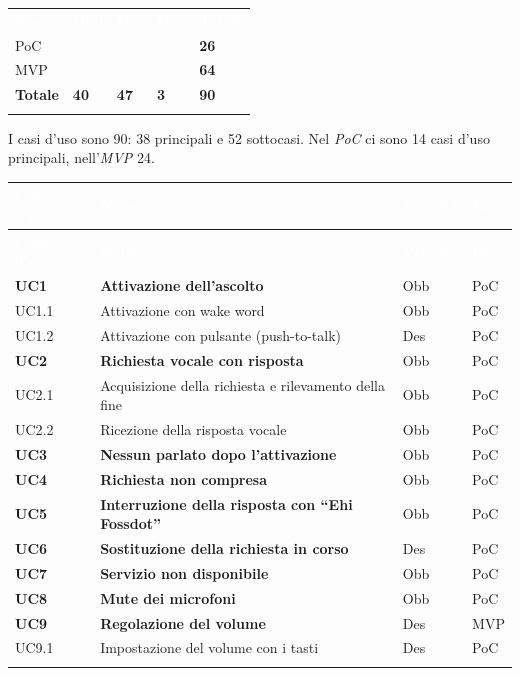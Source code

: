\documentclass[12pt,a4paper]{article}
\newcommand{\thc}[1]{\textcolor{white}{\textbf{#1}}}
\newcommand{\rl}{\\ \arrayrulecolor{bfline}\hline}
\begin{document}
\begin{center}
\begin{tabularx}{0.75\linewidth}{X>{\centering\arraybackslash}p{1.4cm}>{\centering\arraybackslash}p{1.4cm}>{\centering\arraybackslash}p{1.4cm}>{\centering\arraybackslash}p{1.4cm}}
\rowcolor{bfblue}\thc{Fase} & \thc{Obb} & \thc{Des} & \thc{Opz} & \thc{Totale} \\
PoC & 20 & 6 & 0 & \textbf{26} \rl
MVP & 20 & 41 & 3 & \textbf{64} \rl
\textbf{Totale} & \textbf{40} & \textbf{47} & \textbf{3} & \textbf{90} \rl
\end{tabularx}
\end{center}

I casi d'uso sono 90: 38 principali e 52 sottocasi. Nel \emph{PoC} ci sono 14 casi d'uso principali, nell'\emph{MVP} 24.

\begin{longtable}{>{\raggedright\arraybackslash}p{}>{\raggedright\arraybackslash}p{}>{\centering\arraybackslash}p{}>{\centering\arraybackslash}p{}}
\rowcolor{bfblue}\thc{Caso d'uso} & \thc{Nome} & \thc{Priorità} & \thc{Fase} \\
\endfirsthead
\rowcolor{bfblue}\thc{Caso d'uso} & \thc{Nome} & \thc{Priorità} & \thc{Fase} \\
\endhead
\textbf{UC1} & \textbf{Attivazione dell'ascolto} & Obb & PoC \rl
\hspace{1em}UC1.1 & Attivazione con wake word & Obb & PoC \rl
\hspace{1em}UC1.2 & Attivazione con pulsante (push-to-talk) & Des & PoC \rl
\textbf{UC2} & \textbf{Richiesta vocale con risposta} & Obb & PoC \rl
\hspace{1em}UC2.1 & Acquisizione della richiesta e rilevamento della fine & Obb & PoC \rl
\hspace{1em}UC2.2 & Ricezione della risposta vocale & Obb & PoC \rl
\textbf{UC3} & \textbf{Nessun parlato dopo l'attivazione} & Obb & PoC \rl
\textbf{UC4} & \textbf{Richiesta non compresa} & Obb & PoC \rl
\textbf{UC5} & \textbf{Interruzione della risposta con ``Ehi Fossdot''} & Obb & PoC \rl
\textbf{UC6} & \textbf{Sostituzione della richiesta in corso} & Des & PoC \rl
\textbf{UC7} & \textbf{Servizio non disponibile} & Obb & PoC \rl
\textbf{UC8} & \textbf{Mute dei microfoni} & Obb & PoC \rl
\textbf{UC9} & \textbf{Regolazione del volume} & Des & MVP \rl
\hspace{1em}UC9.1 & Impostazione del volume con i tasti & Des & PoC \rl

\end{longtable}
\end{document}
